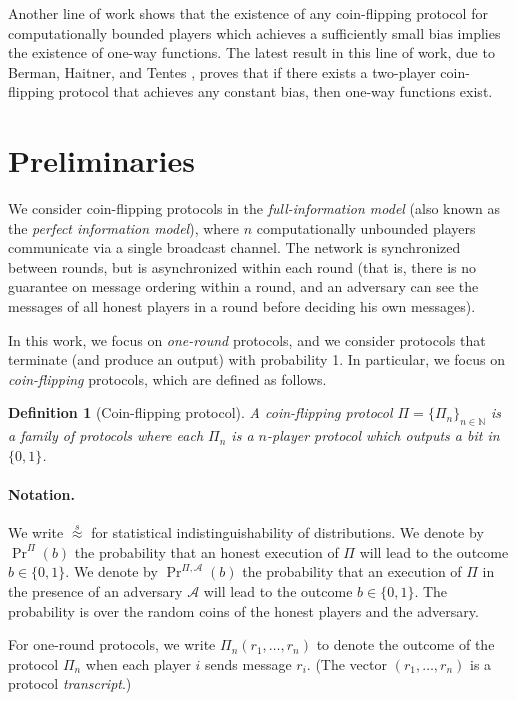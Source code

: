\documentclass[11pt,letterpaper]{article}
\theoremstyle{plain}
\newtheorem{definition}[theorem]{Definition}
\theoremstyle{definition}
\newcommand{\NN}{\mathbb{N}}
\newcommand{\Adv}{\mathcal{A}}
\newcommand{\statIndist}{\overset{s}{\approx}}
\begin{document}
Another line of work shows that the existence of any coin-flipping protocol for computationally bounded players which achieves a sufficiently small bias
implies the existence of one-way functions. The latest result in this line of work, due to Berman, Haitner, and Tentes \cite{BHT14}, proves
that if there exists a two-player coin-flipping protocol that achieves any constant bias, then one-way functions exist.


\section{Preliminaries}

We consider coin-flipping protocols in the \emph{full-information model} (also known as the \emph{perfect information model}), 
where $n$ computationally unbounded players communicate via a single broadcast channel. 
The network is synchronized between rounds, but is asynchronized within each round (that is, there is no guarantee on message ordering within a round,
and an adversary can see the messages of all honest players in a round before deciding his own messages).


In this work, we focus on \emph{one-round} protocols, and we consider protocols that terminate (and produce an output) with probability 1.
In particular, we focus on \emph{coin-flipping} protocols, which are defined as follows.

\begin{definition}[Coin-flipping protocol]\label{def:coinFlipping}
A \emph{coin-flipping protocol} $\Pi=\{\Pi_n\}_{n\in\NN}$ is a family of protocols 
where each $\Pi_n$ is a $n$-player protocol which outputs a bit in $\{0,1\}$.
\end{definition}




\paragraph{Notation.}
We write $\statIndist$ for statistical indistinguishability of distributions.
We denote by $\Pr^\Pi(b)$ the probability that an honest execution of $\Pi$ will lead to the outcome $b\in\{0,1\}$.
We denote by $\Pr^{\Pi,\Adv}(b)$ the probability that an execution of $\Pi$ in the presence of an
adversary $\Adv$ will lead to the outcome $b\in\{0,1\}$. 
The probability is over the random coins of the honest players and the adversary.

For one-round protocols, we write $\Pi_n(r_1,\dots,r_n)$
to denote the outcome of the protocol $\Pi_n$ when each player $i$ sends message $r_i$. 
(The vector $(r_1,\dots,r_n)$ is a protocol \emph{transcript}.)
\end{document}
